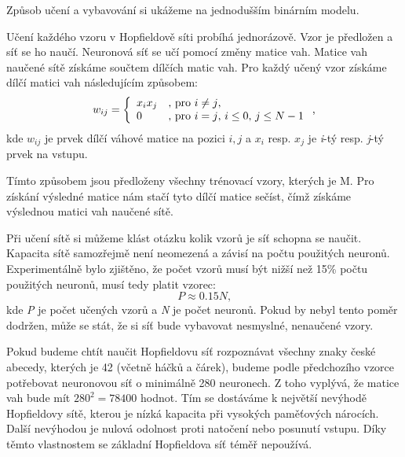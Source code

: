 \documentclass[11pt,twoside,a4paper]{book}
\begin{document}
Způsob učení a vybavování si ukážeme na jednodušším binárním modelu.

Učení každého vzoru v Hopfieldově síti probíhá jednorázově. Vzor je předložen a síť se ho naučí. Neuronová síť se učí pomocí změny matice vah. Matice vah naučené sítě získáme součtem dílčích matic vah. Pro každý učený vzor získáme dílčí matici vah následujícím způsobem:
\begin{equation}
w_{ij} = \left\{ 
\begin{array}{l l}
  x_{i}x_{j} &  \mbox{, pro $i\neq j$, }\\
  0 & \mbox{,  pro $i=j$, $i\leq0$, $j\leq N-1$}\\ \end{array} \right. \mbox{,}
\end{equation}
kde $w_{ij}$ je prvek dílčí váhové matice na pozici $i,j$ a $x_{i}$ resp. $x_{j}$ je \textit{i}-tý resp. \textit{j}-tý prvek na vstupu.

Tímto způsobem jsou předloženy všechny trénovací vzory, kterých je M. Pro získání výsledné matice nám stačí tyto dílčí matice sečíst, čímž získáme výslednou matici vah naučené sítě.

Při učení sítě si můžeme klást otázku kolik vzorů je síť schopna se naučit. Kapacita sítě samozřejmě není neomezená a závisí na počtu použitých neuronů. Experimentálně bylo zjištěno, že počet vzorů musí být nižší než 15\% počtu použitých neuronů\cite{skripta}, musí tedy platit vzorec:
\begin{equation}
P\approx 0.15N \mbox{,}
\end{equation}
kde \textit{P} je počet učených vzorů a \textit{N} je počet neuronů. Pokud by nebyl tento poměr dodržen, může se stát, že si síť bude vybavovat nesmyslné, nenaučené vzory.

Pokud budeme chtít naučit Hopfieldovu síť rozpoznávat všechny znaky české abecedy, kterých je 42 (včetně háčků a čárek), budeme podle předchozího vzorce potřebovat neuronovou síť o minimálně 280 neuronech. Z toho vyplývá, že matice vah bude mít \begin{math}280^{2}=78400\end{math} hodnot. Tím se dostáváme k největší nevýhodě Hopfieldovy sítě, kterou je nízká kapacita při vysokých paměťových nárocích. Další nevýhodou je nulová odolnost proti natočení nebo posunutí vstupu. Díky těmto vlastnostem se základní Hopfieldova síť téměř nepoužívá.
\end{document}

